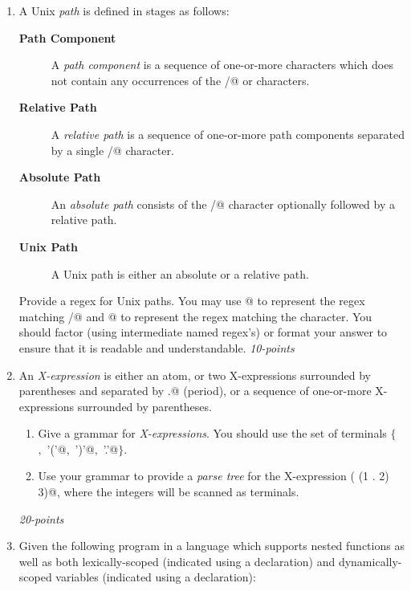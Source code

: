 \documentclass[12pt]{article}
\begin{document}
\begin{enumerate}

\item A Unix \textit{path} is defined in stages as follows:

  \begin{description}
  \item[\textbf{Path Component}]
    A \textit{path component} is a sequence of one-or-more
  characters which does not contain any occurrences of the \verb@/@ or
  \verb@NUL@ characters.
\item[\textbf{Relative Path}] A \textit{relative path} is a sequence
  of one-or-more path components separated by a single \verb@/@
  character.
\item[\textbf{Absolute Path}]
  An \textit{absolute path} consists of the \verb@/@ character
  optionally followed by a relative path.
\item[\textbf{Unix Path}]
  A Unix path is either an absolute or a relative path.
    \end{description}

  Provide a regex for Unix paths.  You may use \verb@\/@ to represent
  the regex matching \verb@/@ and \verb@\0@ to represent the regex
  matching the \verb@NUL@ character.  You should factor (using
  intermediate named regex's) or format your answer to ensure that
  it is readable and understandable.
  \hfill{\textit{10-points}}
  

\item An \textit{X-expression} is either an atom, or two X-expressions
  surrounded by parentheses and separated by \verb@.@ (period), or a
  sequence of one-or-more X-expressions surrounded by parentheses.

  \begin{enumerate}
  \item Give a grammar for \textit{X-expressions}.  You should
    use the set of terminals $\{$ \verb@ATOM@$,$ \verb@'('@$,$ \verb@')'@$,$
      \verb@'.'@$\}$.

  \item Use your grammar to provide a \textit{parse tree} for the
    X-expression \verb@( (1 . 2) 3)@, where the integers will be
    scanned as \verb@ATOM@ terminals.

  \end{enumerate} \hfill\textit{20-points}
  
\item Given the following program in a language which supports nested
  functions as well as both lexically-scoped (indicated using a \verb@lex@
  declaration) and dynamically-scoped variables (indicated using a
  \verb@dyn@ declaration):


\end{enumerate}
\end{document}
